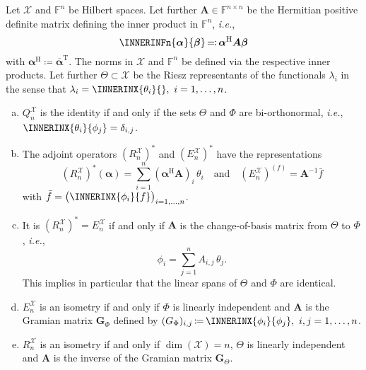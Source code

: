 \documentclass[a4paper]{paper}
\newcommand*{\SPC}[1]{{\ensuremath{\mathscr{#1}}}}
\newcommand*{\SPCX}{\SPC{X}}
\newcommand{\FIELD}{{\ensuremath{\mathbb{F}}}}
\newcommand*{\Fn}{{\ensuremath{\FIELD^n}}}
\newcommand*{\Fnxn}{{\ensuremath{\FIELD^{n \times n}}}}
\newcommand*{\EXT}[2]{\ensuremath{E_{#1}^{#2}}}
\newcommand*{\REST}[2]{\ensuremath{R_{#1}^{#2}}}
\newcommand*{\COPROJ}[2]{\ensuremath{Q_{#1}^{#2}}}
\newcommand*{\RnX}{{\ensuremath{\REST{n}{\SPC{X}}}}}
\newcommand*{\EnX}{{\ensuremath{\EXT{n}{\SPC{X}}}}}
\newcommand*{\QnX}{{\ensuremath{\COPROJ{n}{\SPCX}}}}
\DeclareMathOperator{\DIM}{dim}
\DeclareMathOperator{\DEFEQ}{{\coloneqq}}
\DeclareMathOperator{\EQDEF}{{\eqqcolon}}
\newcommand*{\TRANSP}[1]{{\ensuremath{#1^{\mathrm{T}}}}}
\newcommand*{\HERM}[1]{{\ensuremath{#1^{\mathrm{H}}}}}
\newcommand{\ie}{\textsl{i.e.}\xspace}
\newcommand{\valpha}{\boldsymbol{\alpha}}
\newcommand{\vbeta}{\boldsymbol{\beta}}
\newcommand{\vA}{\boldsymbol{A}}
\newcommand{\vG}{\boldsymbol{G}}
\begin{document}
\begin{lemma}
 \label{lemma:specif:funct:op_prop_hilbert}
 Let $\SPCX$ and $\Fn$ be Hilbert spaces. Let further $\vA \in \Fnxn$ be the Hermitian positive 
 definite matrix defining the inner product in $\Fn$, \ie,
 \begin{equation*}
  \INNERINFn{\valpha}{\vbeta} \EQDEF \HERM{\valpha} \vA \vbeta
 \end{equation*}
 with $\HERM{\valpha} \DEFEQ  \TRANSP{\overline{\valpha}}$. The norms in $\SPCX$ and $\Fn$ be defined via 
 the respective inner products. Let further $\Theta \subset \SPCX$ be the Riesz representants of the functionals 
 $\lambda_i$ in the sense that $\lambda_i = \INNERINX{\theta_i}{},\ i=1,\dots,n$.
 \begin{enumerate}[(a)]
  \item \label{lemma:specif:funct:op_prop_hilbert:Q_identity}
  $\QnX$ is the identity if and only if the sets $\Theta$ and $\Phi$ are bi-orthonormal, \ie, 
  $\INNERINX{\theta_i}{\phi_j} = \delta_{i,j}$.
 
  \item \label{lemma:specif:funct:op_prop_hilbert:R_adjoint_repr}
  The adjoint operators $(\RnX)^*$ and $(\EnX)^*$ have the representations
  \begin{equation*}
   (\RnX)^*(\valpha) = \sum_{i=1}^n (\HERM{\valpha}\vA)_i\, \theta_i
   \quad \text{and} \quad
   (\EnX)^(f) = \vA^{-1} \bar f
  \end{equation*}
  with $\bar f = \big( \INNERINX{\phi_i}{f} \big)_{i=1,\dots,n}$.
  
  \item \label{lemma:specif:funct:op_prop_hilbert:R_E_adjoint_relation}
  It is $(\RnX)^* = \EnX$ if and only if $\vA$ is the change-of-basis matrix from $\Theta$ to $\Phi$, \ie,
  \begin{equation*}
   \phi_i = \sum_{j=1}^n A_{i,j}\, \theta_j.
  \end{equation*}
  This implies in particular that the linear spans of $\Theta$ and $\Phi$ are identical.
 
  \item  \label{lemma:specif:funct:op_prop_hilbert:E_isometry}
  $\EnX$ is an isometry if and only if $\Phi$ is linearly independent and $\vA$ is the Gramian matrix $\vG_\Phi$ 
  defined by $(G_\Phi)_{i,j} \DEFEQ  \INNERINX{\phi_i}{\phi_j},\ i,j=1,\dots,n$.
  
  \item \label{lemma:specif:funct:op_prop_hilbert:R_isometry}
  $\RnX$ is an isometry if and only if $\DIM(\SPCX) = n$, $\Theta$ is linearly independent and $\vA$ is the 
  inverse of the Gramian matrix $\vG_\Theta$.
 \end{enumerate}
\end{lemma}
\vspace{1em}
\end{document}

